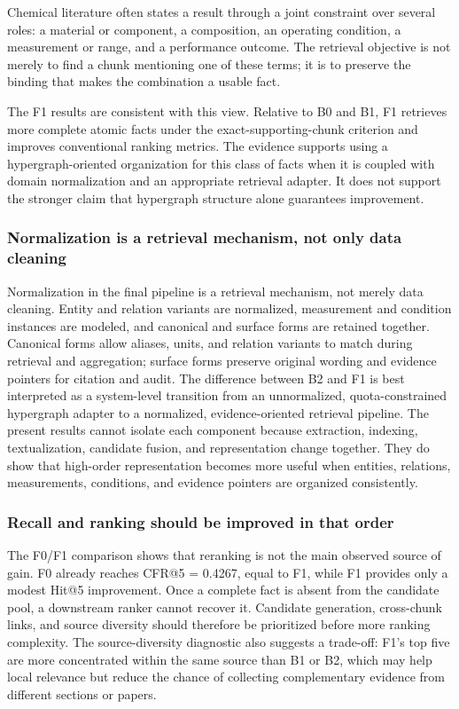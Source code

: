 Chemical literature often states a result through a joint constraint over several roles: a material or component, a composition, an operating condition, a measurement or range, and a performance outcome. The retrieval objective is not merely to find a chunk mentioning one of these terms; it is to preserve the binding that makes the combination a usable fact.

The F1 results are consistent with this view. Relative to B0 and B1, F1 retrieves more complete atomic facts under the exact-supporting-chunk criterion and improves conventional ranking metrics. The evidence supports using a hypergraph-oriented organization for this class of facts when it is coupled with domain normalization and an appropriate retrieval adapter. It does not support the stronger claim that hypergraph structure alone guarantees improvement.

\subsubsection{Normalization is a retrieval mechanism, not only data cleaning}

Normalization in the final pipeline is a retrieval mechanism, not merely data cleaning. Entity and relation variants are normalized, measurement and condition instances are modeled, and canonical and surface forms are retained together. Canonical forms allow aliases, units, and relation variants to match during retrieval and aggregation; surface forms preserve original wording and evidence pointers for citation and audit. The difference between B2 and F1 is best interpreted as a system-level transition from an unnormalized, quota-constrained hypergraph adapter to a normalized, evidence-oriented retrieval pipeline. The present results cannot isolate each component because extraction, indexing, textualization, candidate fusion, and representation change together. They do show that high-order representation becomes more useful when entities, relations, measurements, conditions, and evidence pointers are organized consistently.

\subsubsection{Recall and ranking should be improved in that order}

The F0/F1 comparison shows that reranking is not the main observed source of gain. F0 already reaches CFR@5 = 0.4267, equal to F1, while F1 provides only a modest Hit@5 improvement. Once a complete fact is absent from the candidate pool, a downstream ranker cannot recover it. Candidate generation, cross-chunk links, and source diversity should therefore be prioritized before more ranking complexity. The source-diversity diagnostic also suggests a trade-off: F1's top five are more concentrated within the same source than B1 or B2, which may help local relevance but reduce the chance of collecting complementary evidence from different sections or papers.

